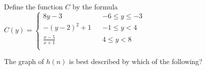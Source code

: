 \documentclass{ximera}
\begin{document}
\begin{definition}
Define the function $C$ by the formula $C(y) =   
\left \{ \begin{aligned}     
8 y - 3 && -6 \leq y \leq -3 \\        
-(y-2)^2 + 1 && -1 \leq y < 4 \\      
\frac{x-5}{x+1} && 4 \leq y < 8\\       
\end{aligned} \right .$ 
\end{definition}






\begin{exercise}
The graph of $h(n)$ is best described by which of the following?

\begin{multipleChoice}
\end{multipleChoice}

\end{exercise}
\end{document}
